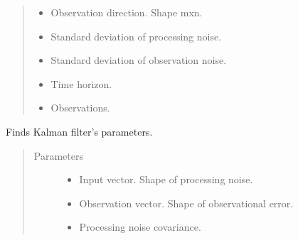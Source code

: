 \documentclass[letterpaper,10pt,english]{sphinxmanual}
\begin{document}
\begin{fulllineitems}
\begin{quote}
\begin{description}
\begin{itemize}
\item {} 
\sphinxAtStartPar
{} \textendash{} Observation direction. Shape mxn.

\item {} 
\sphinxAtStartPar
{} \textendash{} Standard deviation of processing noise.

\item {} 
\sphinxAtStartPar
{} \textendash{} Standard deviation of observation noise.

\item {} 
\sphinxAtStartPar
{} \textendash{} Time horizon.

\item {} 
\sphinxAtStartPar
{} \textendash{} Observations.

\end{itemize}

\end{description}\end{quote}

\begin{fulllineitems}
\label{\detokenize{LDS.LDS.filters:LDS.LDS.filters.kalman_filtering_siso.KalmanFilteringSISO.parameters}}
\sphinxAtStartPar
Finds Kalman filter’s parameters.
\begin{quote}\begin{description}
\item[{Parameters}] \leavevmode\begin{itemize}
\item {} 
\sphinxAtStartPar
{} \textendash{} Input vector. Shape of processing noise.

\item {} 
\sphinxAtStartPar
{} \textendash{} Observation vector. Shape of observational error.

\item {} 
\sphinxAtStartPar
{} \textendash{} Processing noise covariance.


\end{itemize}
\end{description}
\end{quote}
\end{fulllineitems}
\end{fulllineitems}
\end{document}
